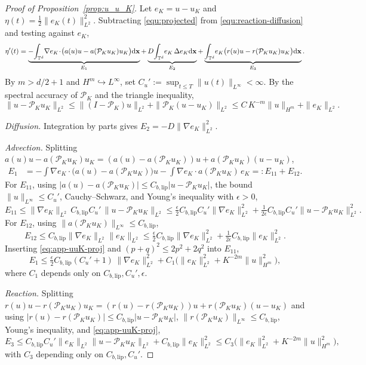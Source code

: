 \documentclass[a4paper,fleqn]{cas-sc}
\theoremstyle{definition}
\theoremstyle{remark}
\begin{document}
\begin{proof}[Proof of Proposition~\ref{prop:u_u_K}]
Let $e_K=u-u_K$ and $\eta(t)=\tfrac12\|e_K(t)\|_{L^2}^2$. Subtracting
\eqref{equ:projected} from \eqref{equ:reaction-diffusion} and testing against $e_K$,
\[
\eta'(t)=\underbrace{-\!\int_{\mathbb T^d}\!\nabla e_K\!\cdot\!\bigl(a(u)u-a(\mathcal P_K u_K)u_K\bigr)\mathrm{d}\mathbf{x}}_{E_1}
+\underbrace{D\!\int_{\mathbb T^d}\! e_K\,\Delta e_K\mathrm{d}\mathbf{x}}_{E_2}
+\underbrace{\int_{\mathbb T^d}\! e_K\bigl(r(u)u-r(\mathcal P_K u_K)u_K\bigr)\mathrm{d}\mathbf{x}}_{E_3}.
\]
By $m>d/2+1$ and $H^m\hookrightarrow L^\infty$, set
$C_u':=\sup_{t\le T}\|u(t)\|_{L^\infty}<\infty$. By the spectral accuracy of
$\mathcal P_K$ and the triangle inequality,
\begin{equation}\label{eq:app-uuK-proj}
\|u-\mathcal P_K u_K\|_{L^2}
\le\|(I-\mathcal P_K)u\|_{L^2}+\|\mathcal P_K(u-u_K)\|_{L^2}
\le C\,K^{-m}\|u\|_{H^m}+\|e_K\|_{L^2}.
\end{equation}

\emph{Diffusion.} Integration by parts gives
$E_2=-D\|\nabla e_K\|_{L^2}^2$.

\emph{Advection.} Splitting
$a(u)u-a(\mathcal P_K u_K)u_K=(a(u)-a(\mathcal P_K u_K))u+a(\mathcal P_K u_K)(u-u_K)$,
\[
\begin{aligned}
E_1
&=-\!\int\!\nabla e_K\!\cdot\!\bigl(a(u)-a(\mathcal P_K u_K)\bigr)u
  -\!\int\!\nabla e_K\!\cdot\! a(\mathcal P_K u_K)\,e_K
=:E_{11}+E_{12}.
\end{aligned}
\]
For $E_{11}$, using $|a(u)-a(\mathcal P_K u_K)|\le C_{b,\mathrm{lip}}|u-\mathcal P_K u_K|$,
the bound $\|u\|_{L^\infty}\le C_u'$, Cauchy--Schwarz, and Young's inequality with
$\epsilon>0$,
\[
E_{11}\le \|\nabla e_K\|_{L^2}\,C_{b,\mathrm{lip}}C_u'\,\|u-\mathcal P_K u_K\|_{L^2}
\le \tfrac{\epsilon}{2}C_{b,\mathrm{lip}}C_u'\|\nabla e_K\|_{L^2}^2
+\tfrac{1}{2\epsilon}C_{b,\mathrm{lip}}C_u'\|u-\mathcal P_K u_K\|_{L^2}^2 .
\]
For $E_{12}$, using $\|a(\mathcal P_K u_K)\|_{L^\infty}\le C_{b,\mathrm{lip}}$,
\[
E_{12}\le C_{b,\mathrm{lip}}\|\nabla e_K\|_{L^2}\|e_K\|_{L^2}
\le \tfrac{\epsilon}{2}C_{b,\mathrm{lip}}\|\nabla e_K\|_{L^2}^2
+\tfrac{1}{2\epsilon}C_{b,\mathrm{lip}}\|e_K\|_{L^2}^2 .
\]
Inserting \eqref{eq:app-uuK-proj} and $(p+q)^2\le2p^2+2q^2$ into $E_{11}$,
\[
E_1\le \tfrac{\epsilon}{2}C_{b,\mathrm{lip}}(C_u'+1)\,\|\nabla e_K\|_{L^2}^2
+C_1\bigl(\|e_K\|_{L^2}^2+K^{-2m}\|u\|_{H^m}^2\bigr),
\]
where $C_1$ depends only on $C_{b,\mathrm{lip}},C_u',\epsilon$.

\emph{Reaction.} Splitting
$r(u)u-r(\mathcal P_K u_K)u_K=(r(u)-r(\mathcal P_K u_K))u+r(\mathcal P_K u_K)(u-u_K)$
and using $|r(u)-r(\mathcal P_K u_K)|\le C_{b,\mathrm{lip}}|u-\mathcal P_K u_K|$,
$\|r(\mathcal P_K u_K)\|_{L^\infty}\le C_{b,\mathrm{lip}}$, Young's inequality, and
\eqref{eq:app-uuK-proj},
\[
E_3\le C_{b,\mathrm{lip}}C_u'\|e_K\|_{L^2}\|u-\mathcal P_K u_K\|_{L^2}
+C_{b,\mathrm{lip}}\|e_K\|_{L^2}^2
\le C_3\bigl(\|e_K\|_{L^2}^2+K^{-2m}\|u\|_{H^m}^2\bigr),
\]
with $C_3$ depending only on $C_{b,\mathrm{lip}},C_u'$.


\end{proof}
\end{document}

